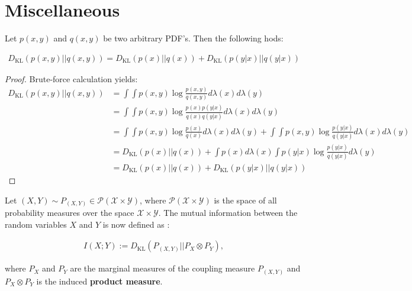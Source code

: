 \section{Miscellaneous}

\begin{lemma}
	Let $p(x, y)$ and $q(x, y)$ be two arbitrary PDF's. Then the following hods:
	
	\begin{align}
		D_{\text{KL}}(p(x, y) \vert\vert q(x, y)) = D_{\text{KL}}(p(x)\vert\vert q(x)) + D_{\text{KL}}(p(y\vert x) \vert\vert q(y\vert x))
	\end{align}
	
	\begin{proof}
		Brute-force calculation yields:
		\begin{align}
			D_{\text{KL}}(p(x, y) \vert\vert q(x, y)) &= \int\int p(x, y)\log\frac{p(x, y)}{q(x, y)}d\lambda(x)d\lambda(y)
			\\[4pt] &= \int\int p(x, y)\log\frac{p(x)p(y\vert x)}{q(x)q(y\vert x)}d\lambda(x)d\lambda(y)
			\\[4pt] &= \int\int p(x, y)\log\frac{p(x)}{q(x)}d\lambda(x)d\lambda(y) + \int\int p(x, y)\log\frac{p(y\vert x)}{q(y\vert x)}d\lambda(x)d\lambda(y)
			\\[4pt] &= D_{\text{KL}}(p(x) \vert\vert q(x)) + \int p(x)d\lambda(x)\int p(y\vert x)\log\frac{p(y\vert x)}{q(y\vert x)}d\lambda(y)
			\\[4pt] &= D_{\text{KL}}(p(x) \vert\vert q(x)) + D_{\text{KL}}(p(y\vert x) \vert\vert q(y\vert x))
		\end{align}
	\end{proof}
\end{lemma}

\begin{defn}
	Let $(X, Y)\sim P_{\left(X, Y\right)}\in \mathcal P(\mathcal X\times \mathcal Y)$, where $\mathcal P(\mathcal X\times \mathcal Y)$ is the space of all probability measures over the space $\mathcal X\times \mathcal Y$. The mutual information between the random variables $X$ and $Y$ is now defined as 
	\cite[Def.~10.1]{ece_ece_5630_lectures10}:
	
	\begin{align}
		I(X; Y) := D_{\text{KL}}\left(P_{(X, Y)} \vert\vert P_{X} \otimes P_{Y}\right),
	\end{align}
	
	\noindent where $P_{X}$ and $P_{Y}$ are the marginal measures of the coupling measure $P_{(X, Y)}$ and $P_{X}\otimes P_{Y}$ is the induced \textbf{product measure}.
\end{defn}

